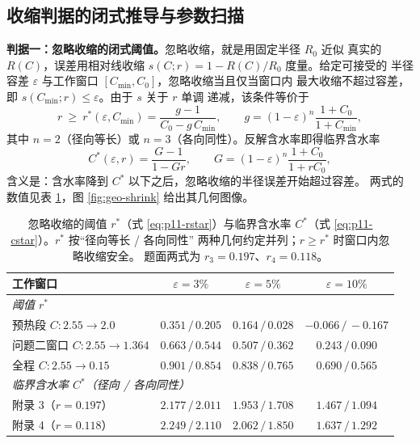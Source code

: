 \documentclass[12pt,a4paper,fontset=none]{ctexart}
\begin{document}
\subsection{收缩判据的闭式推导与参数扫描}
\label{app:shrink}

\textbf{判据一：忽略收缩的闭式阈值。}忽略收缩，就是用固定半径 $R_0$ 近似
真实的 $R(C)$，误差用相对线收缩 $s(C;r)=1-R(C)/R_0$ 度量。给定可接受的
半径容差 $\varepsilon$ 与工作窗口 $[C_{\min},C_0]$，忽略收缩当且仅当窗口内
最大收缩不超过容差，即 $s(C_{\min};r)\le\varepsilon$。由于 $s$ 关于 $r$ 单调
递减，该条件等价于
\begin{equation}
  r\ \ge\ r^\ast(\varepsilon,C_{\min})
  =\frac{g-1}{C_0-g\,C_{\min}},\qquad
  g=(1-\varepsilon)^{n}\frac{1+C_0}{1+C_{\min}},
  \label{eq:p11-rstar}
\end{equation}
其中 $n=2$（径向等长）或 $n=3$（各向同性）。反解含水率即得临界含水率
\begin{equation}
  C^\ast(\varepsilon,r)=\frac{G-1}{1-Gr},\qquad
  G=(1-\varepsilon)^n\frac{1+C_0}{1+rC_0},
  \label{eq:p11-cstar}
\end{equation}
含义是：含水率降到 $C^\ast$ 以下之后，忽略收缩的半径误差开始超过容差。
两式的数值见表 \ref{tab:p11-crit}，图 \ref{fig:geo-shrink} 给出其几何图像。

\begin{table}[htbp]
  \centering
  \caption{忽略收缩的阈值 $r^\ast$（式 \eqref{eq:p11-rstar}）与临界含水率
    $C^\ast$（式 \eqref{eq:p11-cstar}）。$r^\ast$ 按“径向等长 / 各向同性”
    两种几何约定并列；$r\ge r^\ast$ 时窗口内忽略收缩安全。
    题面两式为 $r_3=0.197$、$r_4=0.118$。}
  \label{tab:p11-crit}
  \small
  \begin{tabular}{lccc}
    \toprule
    工作窗口 & $\varepsilon=3\%$ & $\varepsilon=5\%$ & $\varepsilon=10\%$ \\
    \midrule
    \multicolumn{4}{l}{\textit{阈值 $r^\ast$}} \\
    预热段 $C:2.55\to2.0$          & $0.351\,/\,0.205$ & $0.164\,/\,0.028$
      & $-0.066\,/\,-0.167$ \\
    问题二窗口 $C:2.55\to1.364$    & $0.663\,/\,0.544$ & $0.507\,/\,0.362$
      & $0.243\,/\,0.090$ \\
    全程 $C:2.55\to0.15$           & $0.901\,/\,0.854$ & $0.838\,/\,0.765$
      & $0.690\,/\,0.565$ \\
    \midrule
    \multicolumn{4}{l}{\textit{临界含水率 $C^\ast$（径向 / 各向同性）}} \\
    附录 3（$r=0.197$） & $2.177\,/\,2.011$ & $1.953\,/\,1.708$
      & $1.467\,/\,1.094$ \\
    附录 4（$r=0.118$） & $2.249\,/\,2.110$ & $2.062\,/\,1.850$
      & $1.637\,/\,1.292$ \\
    \bottomrule
  \end{tabular}
\end{table}
\end{document}
